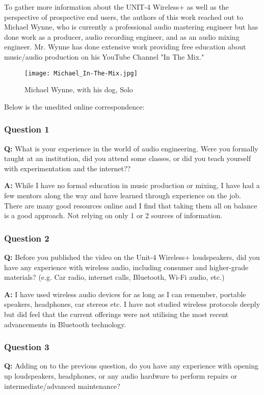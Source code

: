 \documentclass[conference]{IEEEtran}
\begin{document}
To gather more information about the UNIT-4 Wireless+ as well as the perspective of prospective
end users, the authors of this work reached out to Michael Wynne, who is currently a professional
audio mastering engineer but has done work as a producer, audio recording engineer, and as an
audio mixing engineer. Mr. Wynne has done extensive work providing free education about
music/audio production on his YouTube Channel "In The Mix." \cite{wynne_i_nodate}

\begin{figure}[htbp]
    \centering
    \texttt{[image: Michael\_In-The-Mix.jpg]}
    \caption{Michael Wynne, with his dog, Solo}
    \label{fig:in-the-mix_portrait}
\end{figure}

Below is the unedited online correspondence:

\subsubsection*{Question 1}
\textbf{Q:} What is your experience in the world of audio engineering. Were you formally
taught at an institution, did you attend some classes, or did you teach yourself with
experimentation and the internet??

\textbf{A:} While I have no formal education in music production or mixing, I have had a few
mentors along the way and have learned through experience on the job. There are many good
resources online and I find that taking them all on balance is a good approach. Not relying
on only 1 or 2 sources of information.

\subsubsection*{Question 2}
\textbf{Q:} Before you published the video on the Unit-4 Wireless+ loudspeakers, did you have
any experience with wireless audio, including consumer and higher-grade materials? (e.g. Car
radio, internet calls, Bluetooth, Wi-Fi audio, etc.)


\textbf{A:}  I have used wireless audio devices for as long as I can remember, portable
speakers, headphones, car stereos etc. I have not studied wireless protocols deeply but did
feel that the current offerings were not utilising the most recent advancements in Bluetooth
technology.

\subsubsection*{Question 3}
\textbf{Q:} Adding on to the previous question, do you have any experience with opening up
loudspeakers, headphones, or any audio hardware to perform repairs or intermediate/advanced
maintenance?
\end{document}
